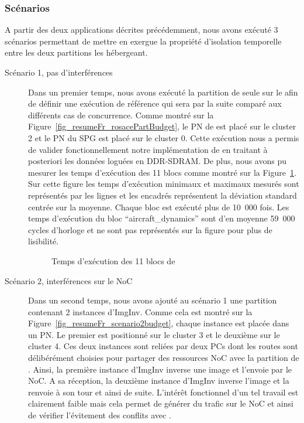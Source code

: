 \documentclass[main.tex]{subfiles}
\begin{document}
\subsubsection{Scénarios}
A partir des deux applications décrites précédemment, nous avons exécuté 3 scénarios permettant de mettre en exergue la propriété d'isolation temporelle entre les deux partitions les hébergeant.
\begin{description}
    \item[Scénario 1, pas d'interférences]
        Dans un premier temps, nous avons exécuté la partition de \rosace seule sur le \mppalong afin de définir une exécution de référence qui sera par la suite comparé aux différents cas de concurrence. Comme montré sur la Figure~\ref{fig_resumeFr_rosacePartBudget}, le PN de \rosace est placé sur le cluster 2 et le PN du SPG est placé sur le cluster 0. Cette exécution nous a permis de valider fonctionnellement notre implémentation de \rosace en traitant à posteriori les données loguées en DDR-SDRAM. De plus, nous avons pu mesurer les temps d'exécution des 11 blocs comme montré sur la Figure~\ref{fig_resumeFr_ETrosace}. Sur cette figure les temps d'exécution minimaux et maximaux mesurés sont représentés par les lignes et les encadrés représentent la déviation standard centrée sur la moyenne. Chaque bloc est exécuté plus de 10~000 fois. Les temps d'exécution du bloc ``aircraft\_dynamics'' sont d'en moyenne 59~000 cycles d'horloge et ne sont pas représentés sur la figure pour plus de lisibilité.

\begin{figure}
    \centering
    \scalebox{1}{}	
    \vspace{-5mm}
    \caption{Temps d'exécution des 11 blocs de \rosace}
	\label{fig_resumeFr_ETrosace}
\end{figure}

    \item[Scénario 2, interférences sur le NoC]
        Dans un second temps, nous avons ajouté au scénario 1 une partition contenant 2 instances d'ImgInv. Comme cela est montré sur la Figure~\ref{fig_resumeFr_scenario2budget}, chaque instance est placée dans un PN. Le premier est positionné sur le cluster 3 et le deuxième sur le cluster 4. Ces deux instances sont reliées par deux PCs dont les routes sont délibérément choisies pour partager des ressources NoC avec la partition de \rosace. Ainsi, la première instance d'ImgInv inverse une image et l'envoie par le NoC. A sa réception, la deuxième instance d'ImgInv inverse l'image et la renvoie à son tour et ainsi de suite. L'intérêt fonctionnel d'un tel travail est clairement faible mais cela permet de générer du trafic sur le NoC et ainsi de vérifier l'évitement des conflits avec \rosace. 


\end{description}
\end{document}
